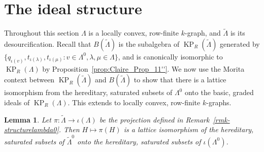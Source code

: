 \documentclass[a4paper,12pt]{amsart}
\numberwithin{equation}{section}
\newtheorem{lemma}[thm]{Lemma}
\theoremstyle{definition}
\theoremstyle{remark}
\begin{document}
\section{The ideal structure}\label{sec-ideals}
Throughout this section $\Lambda$ is a locally convex, row-finite $k$-graph, and  ${\tilde{\Lambda}}$ is its desourcification. Recall that $B(\tilde\Lambda)$ is the subalgebra  of $\operatorname{KP}_R(\tilde{\Lambda})$ generated by $\{q_{\iota(v)}, t_{\iota(\lambda)}, t_{\iota(\mu)}:v\in\Lambda^0, \lambda,\mu\in\Lambda\}$, and is canonically isomorphic to $\operatorname{KP}_R(\Lambda)$ by Proposition~\ref{prop:Claire_Prop_11''}.  We now use the Morita context between $\operatorname{KP}_R({\tilde{\Lambda}})$ and $B({\tilde{\Lambda}})$ to show that there is a lattice isomorphism from the hereditary, saturated subsets of $\Lambda^{0}$ onto the basic, graded ideals of $\operatorname{KP}_R(\Lambda)$. This extends \cite[Theorem~5.1]{ACaHR} to locally convex, row-finite $k$-graphs.

\begin{lemma}\label{inversepi}
Let $\pi:{\tilde{\Lambda}}\to\iota(\Lambda)$ be the projection defined in Remark~\ref{rmk-structurelambda0}. Then $H\mapsto  \pi(H)$ is a lattice isomorphism of the hereditary, saturated subsets of ${\tilde{\Lambda}}^0$ onto the hereditary, saturated subsets of $\iota(\Lambda^0)$.  
\end{lemma}
\end{document}
